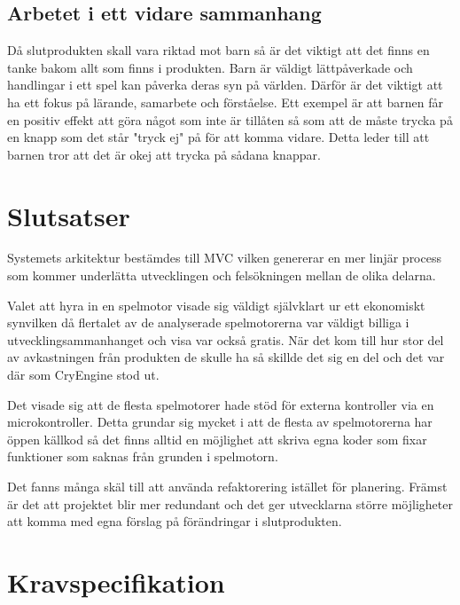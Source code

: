 \documentclass[a4paper,12pt,oneside,final]{extbook}
\begin{document}
\section{Arbetet i ett vidare sammanhang}

Då slutprodukten skall vara riktad mot barn så är det viktigt att det finns en tanke bakom allt som finns i produkten. Barn är väldigt lättpåverkade och handlingar i ett spel kan påverka deras syn på världen. Därför är det viktigt att ha ett fokus på lärande, samarbete och förståelse. Ett exempel är att barnen får en positiv effekt att göra något som inte är tillåten så som att de måste trycka på en knapp som det står "tryck ej" på för att komma vidare. Detta leder till att barnen tror att det är okej att trycka på sådana knappar.


\chapter{Slutsatser}
Systemets arkitektur bestämdes till MVC vilken genererar en mer linjär process som kommer underlätta utvecklingen och felsökningen mellan de olika delarna.

Valet att hyra in en spelmotor visade sig väldigt självklart ur ett ekonomiskt synvilken då flertalet av de analyserade spelmotorerna var väldigt billiga i utvecklingsammanhanget och visa var också gratis. När det kom till hur stor del av avkastningen från produkten de skulle ha så skillde det sig en del och det var där som CryEngine stod ut. 

Det visade sig att de flesta spelmotorer hade stöd för externa kontroller via en microkontroller. Detta grundar sig mycket i att de flesta av spelmotorerna har öppen källkod så det finns alltid en möjlighet att skriva egna koder som fixar funktioner som saknas från grunden i spelmotorn.

Det fanns många skäl till att använda refaktorering istället för planering. Främst är det att projektet blir mer redundant och det ger utvecklarna större möjligheter att komma med egna förslag på förändringar i slutprodukten.







\pagestyle{empty}

\appendix


\chapter{Kravspecifikation}\label{Kravspecifikation}
\end{document}

